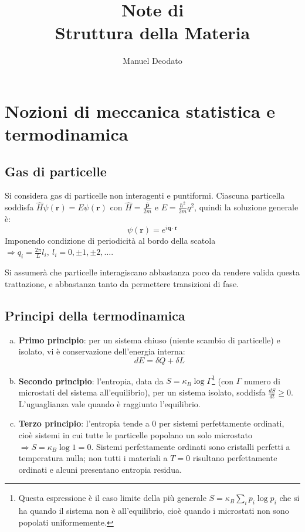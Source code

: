\documentclass[10pt, a4paper]{scrartcl}
\title{Note di\\\vspace{.2cm} Struttura della Materia}
\author{Manuel Deodato}
\date{}
\renewcommand{\maketitle}{
\begin{center}
{\sffamily
{\fontsize{20}{20}\selectfont\MakeUppercase\thetitle}}

\vspace{0.2in}

{\large\scshape\sffamily\theauthor}
\end{center}
}
\numberwithin{equation}{subsection}
\theoremstyle{style1}
\theoremstyle{style2}
\begin{document}
\maketitle
\newpage
\tableofcontents 
\newpage
\section{Nozioni di meccanica statistica e termodinamica}

\subsection{Gas di particelle}


Si considera gas di particelle non interagenti e puntiformi. Ciascuna particella soddisfa $\hat{H}\psi (\mathbf{r} ) = E  \psi (\mathbf{r} )$ con $\hat{H} = \frac{\hat{\mathbf{p} }}{2m}$ e $E = \frac{\hbar ^2}{2m} q ^2 $, quindi la soluzione generale \`e:
\begin{equation}
	\psi (\mathbf{r} ) = e^{ i \mathbf{q} \cdot \mathbf{r} } 
\end{equation}
Imponendo condizione di periodicit\`a al bordo della scatola $\Rightarrow q_i = \frac{2\pi}{L}l_i, \ l_i = 0, \pm 1,\pm 2,\ldots$. 

Si assumer\`a che particelle interagiscano abbastanza poco da rendere valida questa trattazione, e abbastanza tanto da permettere transizioni di fase.
\subsection{Principi della termodinamica}
\begin{enumerate}[(a).]
	\item \textbf{Primo principio}: per un sistema chiuso (niente scambio di particelle) e isolato, vi \`e conservazione dell'energia interna:
		\begin{equation}
			dE = \delta  Q + \delta L
		\end{equation}
	\item \textbf{Secondo principio}: l'entropia, data da $S = \kappa _B \log \Gamma$\footnote{Questa espressione \`e il caso limite della pi\`u generale $S = \kappa _B \sum_{i}^{} p_i \log p_i$ che si ha quando il sistema non \`e all'equilibrio, cio\`e quando i microstati non sono popolati uniformemente.} (con $\Gamma$ numero di microstati del sistema all'equilibrio), per un sistema isolato, soddisfa $\frac{d S}{d t} \ge 0$. L'uguaglianza vale quando \`e raggiunto l'equilibrio.
	\item \textbf{Terzo principio}: l'entropia tende a $0$ per sistemi perfettamente ordinati, cio\`e sistemi in cui tutte le particelle popolano un solo microstato $\Rightarrow S = \kappa _B \log 1 = 0$. Sistemi perfettamente ordinati sono cristalli perfetti a temperatura nulla; non tutti i materiali a $T=0$ risultano perfettamente ordinati e alcuni presentano entropia residua.
\end{enumerate}
\end{document}
